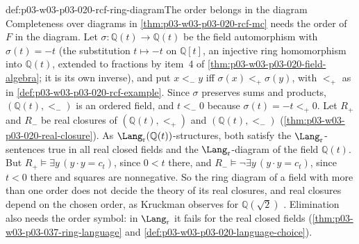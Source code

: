 \begin{hbwarning}{def:p03-w03-p03-020-rcf-ring-diagram}{The order belongs in the diagram}
Completeness over diagrams in \cref{thm:p03-w03-p03-020-rcf-mc}
needs the order of \(F\) in the diagram. Let
\(\sigma:\mathbb Q(t)\to\mathbb Q(t)\) be the field automorphism with
\(\sigma(t)=-t\) (the substitution \(t\mapsto-t\) on \(\mathbb Q[t]\), an
injective ring homomorphism into \(\mathbb Q(t)\), extended to fractions by
item~4 of \cref{thm:p03-w03-p03-020-field-algebra}; it is its own inverse),
and put \(x<_-y\) iff \(\sigma(x)<_+\sigma(y)\), with \(<_+\) as in
\cref{def:p03-w03-p03-020-rcf-example}. Since \(\sigma\) preserves sums and
products, \((\mathbb Q(t),<_-)\) is an ordered field, and \(t<_-0\) because
\(\sigma(t)=-t<_+0\). Let \(R_+\) and \(R_-\) be real closures of
\((\mathbb Q(t),<_+)\) and \((\mathbb Q(t),<_-)\)
(\cref{thm:p03-w03-p03-020-real-closure}). As
\(\Lang_{\mathrm r}(\mathbb Q(t))\)-structures, both satisfy the
\(\Lang_{\mathrm r}\)-sentences true in all real closed fields and the
\(\Lang_{\mathrm r}\)-diagram of the field \(\mathbb Q(t)\). But
\(R_+\models\exists y\,(y\mathbin{\cdot}y=c_t)\), since \(0<t\) there, and
\(R_-\models\neg\exists y\,(y\mathbin{\cdot}y=c_t)\), since \(t<0\) there and
squares are nonnegative. So the ring diagram of a field with more than one
order does not decide the theory of its real closures, and real closures
depend on the chosen order, as Kruckman observes for
\(\mathbb Q(\sqrt2)\) \cite[Example~3.4, p.~25]{Kruckman2020}. Elimination
also needs the order symbol: in \(\Lang_{\mathrm r}\) it fails for the real
closed fields (\cref{thm:p03-w03-p03-037-ring-language} and
\cref{def:p03-w03-p03-020-language-choice}).
\end{hbwarning}
